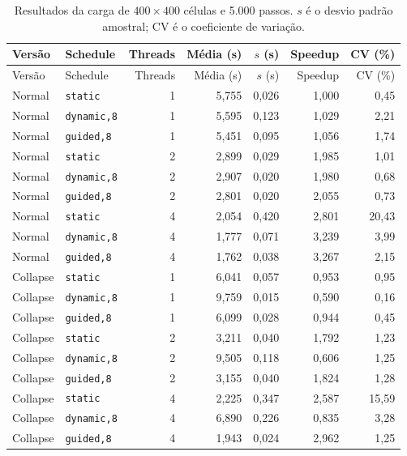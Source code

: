 \begin{longtable}{llrrrrr}
\caption{Resultados da carga de $400\times400$ células e 5.000 passos. $s$ é o desvio padrão amostral; CV é o coeficiente de variação.}\label{tab:resultados}\\
\toprule Versão & Schedule & Threads & Média (s) & $s$ (s) & Speedup & CV (\%) \\
\midrule\endfirsthead
\toprule Versão & Schedule & Threads & Média (s) & $s$ (s) & Speedup & CV (\%) \\
\midrule\endhead
\bottomrule\endfoot
Normal & \texttt{static} & 1 & 5,755 & 0,026 & 1,000 & 0,45 \\
Normal & \texttt{dynamic,8} & 1 & 5,595 & 0,123 & 1,029 & 2,21 \\
Normal & \texttt{guided,8} & 1 & 5,451 & 0,095 & 1,056 & 1,74 \\
Normal & \texttt{static} & 2 & 2,899 & 0,029 & 1,985 & 1,01 \\
Normal & \texttt{dynamic,8} & 2 & 2,907 & 0,020 & 1,980 & 0,68 \\
Normal & \texttt{guided,8} & 2 & 2,801 & 0,020 & 2,055 & 0,73 \\
Normal & \texttt{static} & 4 & 2,054 & 0,420 & 2,801 & 20,43 \\
Normal & \texttt{dynamic,8} & 4 & 1,777 & 0,071 & 3,239 & 3,99 \\
Normal & \texttt{guided,8} & 4 & 1,762 & 0,038 & 3,267 & 2,15 \\
\midrule
Collapse & \texttt{static} & 1 & 6,041 & 0,057 & 0,953 & 0,95 \\
Collapse & \texttt{dynamic,8} & 1 & 9,759 & 0,015 & 0,590 & 0,16 \\
Collapse & \texttt{guided,8} & 1 & 6,099 & 0,028 & 0,944 & 0,45 \\
Collapse & \texttt{static} & 2 & 3,211 & 0,040 & 1,792 & 1,23 \\
Collapse & \texttt{dynamic,8} & 2 & 9,505 & 0,118 & 0,606 & 1,25 \\
Collapse & \texttt{guided,8} & 2 & 3,155 & 0,040 & 1,824 & 1,28 \\
Collapse & \texttt{static} & 4 & 2,225 & 0,347 & 2,587 & 15,59 \\
Collapse & \texttt{dynamic,8} & 4 & 6,890 & 0,226 & 0,835 & 3,28 \\
Collapse & \texttt{guided,8} & 4 & 1,943 & 0,024 & 2,962 & 1,25 \\
\end{longtable}

